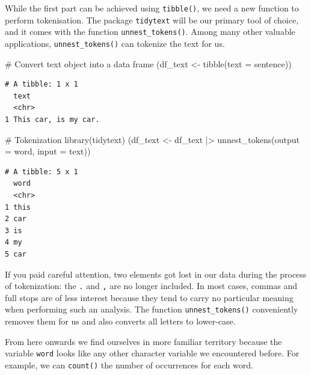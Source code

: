 \documentclass[
  letterpaper,
]{krantz}
\makeatletter
\newenvironment{Shaded}{\begin{snugshade}}{\end{snugshade}}
\newcommand{\AttributeTok}[1]{\textcolor[rgb]{0.40,0.45,0.13}{#1}}
\newcommand{\CommentTok}[1]{\textcolor[rgb]{0.37,0.37,0.37}{#1}}
\newcommand{\FunctionTok}[1]{\textcolor[rgb]{0.28,0.35,0.67}{#1}}
\newcommand{\NormalTok}[1]{\textcolor[rgb]{0.00,0.23,0.31}{#1}}
\newcommand{\OtherTok}[1]{\textcolor[rgb]{0.00,0.23,0.31}{#1}}
\newcommand{\SpecialCharTok}[1]{\textcolor[rgb]{0.37,0.37,0.37}{#1}}
\newenvironment{kframe}{%
\medskip{}
\setlength{\fboxsep}{.8em}
 \def\at@end@of@kframe{}%
 \ifinner\ifhmode%
  \def\at@end@of@kframe{\end{minipage}}%
  \begin{minipage}{\columnwidth}%
 \fi\fi%
 \def\FrameCommand##1{\hskip\@totalleftmargin \hskip-\fboxsep
 \colorbox{shadecolor}{##1}\hskip-\fboxsep
     \hskip-\linewidth \hskip-\@totalleftmargin \hskip\columnwidth}%
 \MakeFramed {\advance\hsize-\width
   \@totalleftmargin\z@ \linewidth\hsize
   \@setminipage}}%
 {\par\unskip\endMakeFramed%
 \at@end@of@kframe}
\renewenvironment{Shaded}{\begin{kframe}}{\end{kframe}}
\makeatother
\begin{document}
While the first part can be achieved using \texttt{tibble()}, we need a
new function to perform tokenisation. The package \texttt{tidytext} will
be our primary tool of choice, and it comes with the function
\texttt{unnest\_tokens()}. Among many other valuable applications,
\texttt{unnest\_tokens()} can tokenize the text for us.

\begin{Shaded}
\begin{Highlighting}[]
\CommentTok{\# Convert text object into a data frame}
\NormalTok{(df\_text }\OtherTok{\textless{}{-}} \FunctionTok{tibble}\NormalTok{(}\AttributeTok{text =}\NormalTok{ sentence))}
\end{Highlighting}
\end{Shaded}

\begin{verbatim}
# A tibble: 1 x 1
  text                
  <chr>               
1 This car, is my car.
\end{verbatim}

\begin{Shaded}
\begin{Highlighting}[]
\CommentTok{\# Tokenization}
\FunctionTok{library}\NormalTok{(tidytext)}
\NormalTok{(df\_text }\OtherTok{\textless{}{-}}\NormalTok{ df\_text }\SpecialCharTok{|\textgreater{}} \FunctionTok{unnest\_tokens}\NormalTok{(}\AttributeTok{output =}\NormalTok{ word,}
                                      \AttributeTok{input =}\NormalTok{ text))}
\end{Highlighting}
\end{Shaded}

\begin{verbatim}
# A tibble: 5 x 1
  word 
  <chr>
1 this 
2 car  
3 is   
4 my   
5 car  
\end{verbatim}

If you paid careful attention, two elements got lost in our data during
the process of tokenization: the \texttt{.} and \texttt{,} are no longer
included. In most cases, commas and full stops are of less interest
because they tend to carry no particular meaning when performing such an
analysis. The function \texttt{unnest\_tokens()} conveniently removes
them for us and also converts all letters to lower-case.

From here onwards we find ourselves in more familiar territory because
the variable \texttt{word} looks like any other character variable we
encountered before. For example, we can \texttt{count()} the number of
occurrences for each word.
\end{document}
